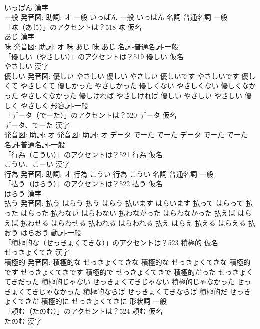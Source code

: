 \documentclass[8pt]{extreport}
\begin{document}
\begin{CJK}{UTF8}{min}
\\	いっぱん 漢字　
\\	一般 発音図: 助詞: オ	一般 いっぱん		一般 いっぱん				名詞-普通名詞-一般 
\\	「味（あじ）」のアクセントは？518	味 仮名　
\\	あじ 漢字　
\\	味 発音図: 助詞: オ	味 あじ		味 あじ				名詞-普通名詞-一般 
\\	「優しい（やさしい）」のアクセントは？519	優しい 仮名　
\\	やさしい 漢字　
\\	優しい 発音図:	優しい やさしい		優しい やさしい 優しいです やさしいです 優しくて やさしくて 優しかった やさしかった 優しくない やさしくない 優しくなかった やさしくなかった 優しければ やさしければ 優しい やさしい やさしい 優しく やさしく				形容詞-一般 
\\	「データ（でーた）」のアクセントは？520	データ 仮名　
\\	データ、でーた 漢字　
\\	発音図: 助詞: オ 発音図: 助詞: オ	データ でーた でーた		データ でーた でーた				名詞-普通名詞-一般 
\\	「行為（こうい）」のアクセントは？521	行為 仮名　
\\	こうい、こーい 漢字　
\\	行為 発音図: 助詞: オ	行為 こうい		行為 こうい				名詞-普通名詞-一般 
\\	「払う（はらう）」のアクセントは？522	払う 仮名　
\\	はらう 漢字　
\\	払う 発音図:	払う はらう		払う はらう 払います はらいます 払って はらって 払った はらった 払わない はらわない 払わなかった はらわなかった 払えば はらえば 払わせる はらわせる 払われる はらわれる 払え はらえ 払える はらえる 払おう はらおう				動詞-一般 
\\	「積極的な（せっきょくてきな）」のアクセントは？523	積極的 仮名　
\\	せっきょくてき 漢字　
\\	積極的 発音図:	積極的な せっきょくてきな		積極的な せっきょくてきな 積極的です せっきょくてきです 積極的で せっきょくてきで 積極的だった せっきょくてきだった 積極的じゃない せっきょくてきじゃない 積極的じゃなかった せっきょくてきじゃなかった 積極的ならば せっきょくてきならば 積極的だ せっきょくてきだ 積極的に せっきょくてきに				形状詞-一般 
\\	「頼む（たのむ）」のアクセントは？524	頼む 仮名　
\\	たのむ 漢字　

\end{CJK}
\end{document}
